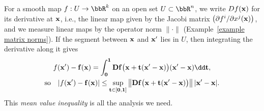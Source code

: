 For a smooth map $f:U\to\bbR^k$ on an open set $U\subset\bbR^n$, we write $Df(\bf{x})$ for its derivative at $\bf{x}$, i.e., the linear map given by the Jacobi matrix $\big(\partial f^i/\partial x^j(\bf{x})\big)$, and we measure linear maps by the operator norm $\lVert\cdot\rVert$ (Example~\ref{example matrix norms}). If the segment between $\bf{x}$ and $\bf{x}'$ lies in $U$, then integrating the derivative along it gives
\[\begin{gathered}
    f(\bf{x}')-f(\bf{x})=\int_0^1Df\big(\bf{x}+t(\bf{x}'-\bf{x})\big)(\bf{x}'-\bf{x})\dd t,\\
    \text{so}\quad\lvert f(\bf{x}')-f(\bf{x})\rvert\leq\sup_{t\in[0,1]}\big\lVert Df\big(\bf{x}+t(\bf{x}'-\bf{x})\big)\big\rVert\,\lvert\bf{x}'-\bf{x}\rvert.
\end{gathered}\]
This \emph{mean value inequality} is all the analysis we need.

